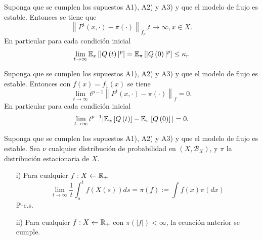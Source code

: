 \begin{Teo}\label{Tma.6.2.DaiSean}
Suponga que se cumplen los supuestos A1), A2) y A3) y que el
modelo de flujo es estable. Entonces se tiene que
\begin{equation}
\left\|P^{t}\left(x,\cdot\right)-\pi\left(\cdot\right)\right\|_{f_{p}}\textrm{,
}t\rightarrow\infty,x\in X.
\end{equation}
En particular para cada condici\'on inicial
\begin{eqnarray*}
\lim_{t\rightarrow\infty}\mathbb{E}_{x}\left[|Q\left(t\right)|^{p}\right]=\mathbb{E}_{\pi}\left[|Q\left(0\right)|^{p}\right]\leq\kappa_{r}
\end{eqnarray*}
\end{Teo}
\begin{Teo}\label{Tma.6.3.DaiSean}
Suponga que se cumplen los supuestos A1), A2) y A3) y que el
modelo de flujo es estable. Entonces con
$f\left(x\right)=f_{1}\left(x\right)$ se tiene
\begin{equation}
\lim_{t\rightarrow\infty}t^{p-1}\left\|P^{t}\left(x,\cdot\right)-\pi\left(\cdot\right)\right\|_{f}=0.
\end{equation}
En particular para cada condici\'on inicial
\begin{eqnarray*}
\lim_{t\rightarrow\infty}t^{p-1}|\mathbb{E}_{x}\left[Q\left(t\right)\right]-\mathbb{E}_{\pi}\left[Q\left(0\right)\right]|=0.
\end{eqnarray*}
\end{Teo}

\begin{Teo}\label{Tma.6.4.DaiSean}
Suponga que se cumplen los supuestos A1), A2) y A3) y que el
modelo de flujo es estable. Sea $\nu$ cualquier distribuci\'on de
probabilidad en $\left(X,\mathcal{B}_{X}\right)$, y $\pi$ la
distribuci\'on estacionaria de $X$.
\begin{itemize}
\item[i)] Para cualquier $f:X\leftarrow\mathbb{R}_{+}$
\begin{equation}
\lim_{t\rightarrow\infty}\frac{1}{t}\int_{o}^{t}f\left(X\left(s\right)\right)ds=\pi\left(f\right):=\int
f\left(x\right)\pi\left(dx\right)
\end{equation}
$\mathbb{P}$-c.s.

\item[ii)] Para cualquier $f:X\leftarrow\mathbb{R}_{+}$ con
$\pi\left(|f|\right)<\infty$, la ecuaci\'on anterior se cumple.
\end{itemize}
\end{Teo}

